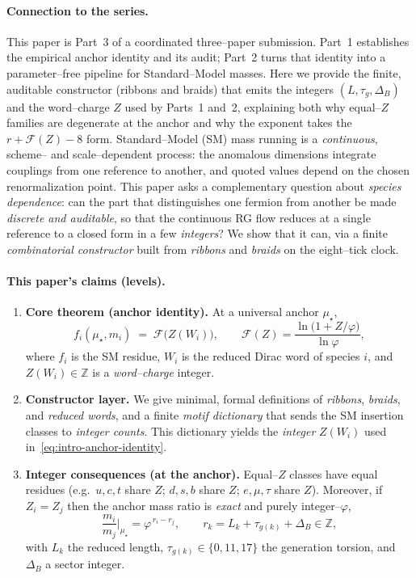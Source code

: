 \documentclass[epjc3]{svjour3}
\begin{document}
\paragraph{Connection to the series.}
This paper is Part~3 of a coordinated three--paper submission. Part~1 establishes the empirical anchor identity and its audit; Part~2 turns that identity into a parameter--free pipeline for Standard--Model masses. Here we provide the finite, auditable constructor (ribbons and braids) that emits the integers $(L,\tau_g,\Delta_B)$ and the word--charge $Z$ used by Parts~1 and~2, explaining both why equal--$Z$ families are degenerate at the anchor and why the exponent takes the $r+\mathcal F(Z)-8$ form.
Standard--Model (SM) mass running is a \emph{continuous}, scheme-- and scale--dependent process: the anomalous dimensions integrate couplings from one reference to another, and quoted values depend on the chosen renormalization point. This paper asks a complementary question about \emph{species dependence}: can the part that distinguishes one fermion from another be made \emph{discrete and auditable}, so that the continuous RG flow reduces at a single reference to a closed form in a few \emph{integers}? We show that it can, via a finite \emph{combinatorial constructor} built from \emph{ribbons} and \emph{braids} on the eight--tick clock.

\paragraph{This paper's claims (levels).}
\begin{enumerate}
  \item \textbf{Core theorem (anchor identity).}  At a universal anchor $\mu_\star$,
  \begin{equation}
    f_i(\mu_\star,m_i)
    \;=\;
    \mathcal F\!\bigl(Z(W_i)\bigr),
    \qquad
    \mathcal F(Z)=\frac{\ln\!\bigl(1+Z/\varphi\bigr)}{\ln\varphi},
    \label{eq:intro-anchor-identity}
  \end{equation}
  where $f_i$ is the SM residue, $W_i$ is the reduced Dirac word of species $i$, and $Z(W_i)\in\mathbb Z$ is a \emph{word--charge} integer.
  \item \textbf{Constructor layer.}  We give minimal, formal definitions of \emph{ribbons}, \emph{braids}, and \emph{reduced words}, and a finite \emph{motif dictionary} that sends the SM insertion classes to \emph{integer counts}. This dictionary yields the \emph{integer} $Z(W_i)$ used in~\eqref{eq:intro-anchor-identity}.
  \item \textbf{Integer consequences (at the anchor).}  Equal--$Z$ classes have equal residues (e.g.\ $u,c,t$ share $Z$; $d,s,b$ share $Z$; $e,\mu,\tau$ share $Z$). Moreover, if $Z_i=Z_j$ then the anchor mass ratio is \emph{exact} and purely integer--$\varphi$,
  \begin{equation}
      \frac{m_i}{m_j}\Big|_{\mu_\star}=\varphi^{\,r_i-r_j},
      \qquad
      r_k=L_k+\tau_{g(k)}+\Delta_B\in\mathbb{Z},
      \label{eq:intro-anchor-ratio}
  \end{equation}
  with $L_k$ the reduced length, $\tau_{g(k)}\in\{0,11,17\}$ the generation torsion, and $\Delta_B$ a sector integer.
\end{enumerate}
\end{document}
